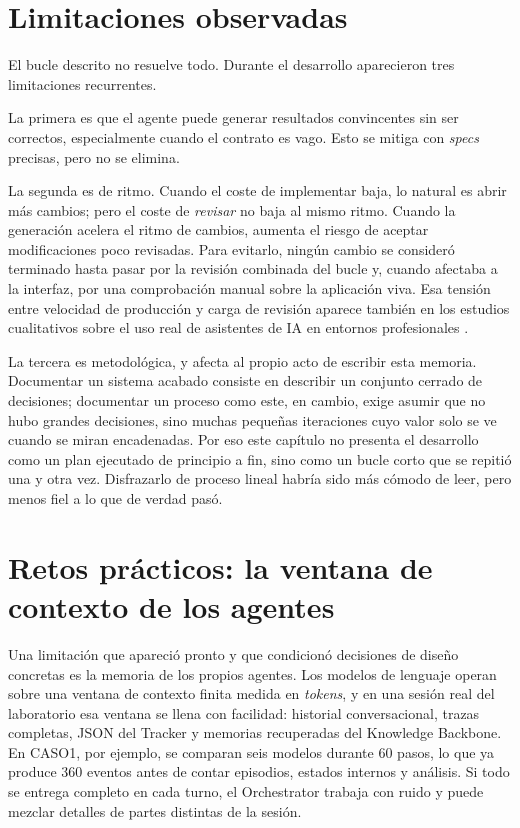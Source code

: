 \section{Limitaciones observadas}

El bucle descrito no resuelve todo. Durante el desarrollo aparecieron tres
limitaciones recurrentes.

La primera es que el agente puede generar resultados convincentes sin
ser correctos, especialmente cuando el contrato es vago. Esto se mitiga
con \textit{specs} precisas, pero no se elimina.

La segunda es de ritmo. Cuando el coste de implementar baja, lo natural
es abrir más cambios; pero el coste de \emph{revisar} no baja al
mismo ritmo. Cuando la generación acelera el ritmo de cambios, aumenta el
riesgo de aceptar modificaciones poco revisadas. Para evitarlo, ningún cambio
se consideró terminado hasta pasar por la revisión combinada del bucle y,
cuando afectaba a la interfaz, por una comprobación manual sobre la aplicación
viva. Esa tensión entre velocidad de producción y carga de revisión aparece
también en los estudios cualitativos sobre el uso real de asistentes
de IA en entornos profesionales \cite{butler2024dear}.

La tercera es metodológica, y afecta al propio acto de escribir esta
memoria. Documentar un sistema acabado consiste en describir un
conjunto cerrado de decisiones; documentar un proceso como este,
en cambio, exige asumir que no hubo grandes decisiones, sino muchas
pequeñas iteraciones cuyo valor solo se ve cuando se miran encadenadas.
Por eso este capítulo no presenta el desarrollo como un plan ejecutado
de principio a fin, sino como un bucle corto que se repitió una y otra
vez. Disfrazarlo de proceso lineal habría sido más cómodo de leer,
pero menos fiel a lo que de verdad pasó.

\section[Retos prácticos]{Retos prácticos: la ventana de contexto de los agentes}

Una limitación que apareció pronto y que condicionó decisiones de
diseño concretas es la memoria de los propios agentes. Los modelos de
lenguaje operan sobre una ventana de contexto finita medida en
\textit{tokens}, y en una sesión real del laboratorio esa ventana se
llena con facilidad: historial conversacional, trazas completas, JSON del
Tracker y memorias recuperadas del Knowledge Backbone. En CASO1, por ejemplo,
se comparan seis modelos durante 60 pasos, lo que ya produce 360 eventos antes
de contar episodios, estados internos y análisis. Si todo se entrega completo en
cada turno, el Orchestrator trabaja con ruido y puede mezclar detalles de partes
distintas de la sesión.

